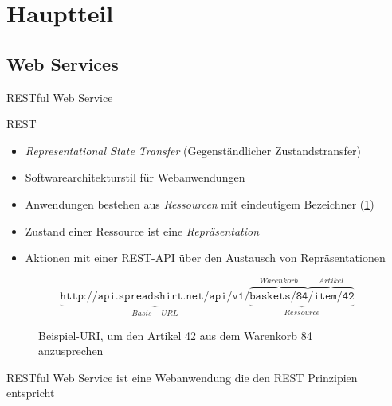 \section{Hauptteil}

\subsection{Web Services}
\begin{frame}{RESTful Web Service}
    \begin{block}{REST}
        \begin{itemize}
            \item \emph{Representational State Transfer} (Gegenständlicher Zustandstransfer)
            \item Softwarearchitekturstil für Webanwendungen
            \item Anwendungen bestehen aus \emph{Ressourcen} mit eindeutigem Bezeichner (\cref{restURI}) %
            \item Zustand einer Ressource ist eine \emph{Repräsentation}
            \item Aktionen mit einer REST-API über den Austausch von Repräsentationen
        \end{itemize}
    \end{block}
\end{frame}

\begin{frame}
    \begin{figure}
        \centering
        \[
            \underbrace{\texttt{http://api.spreadshirt.net/api/v1/}}_{Basis-URL}\underbrace{\overbrace{\texttt{baskets/84}}^{Warenkorb}\overbrace{\texttt{/item/42}}^{Artikel}}_{Ressource}
        \]
        \caption{Beispiel-URI, um den Artikel 42 aus dem Warenkorb 84 anzusprechen}
        \label{restURI}
    \end{figure}
    RESTful Web Service ist eine Webanwendung die den REST Prinzipien entspricht
\end{frame}

